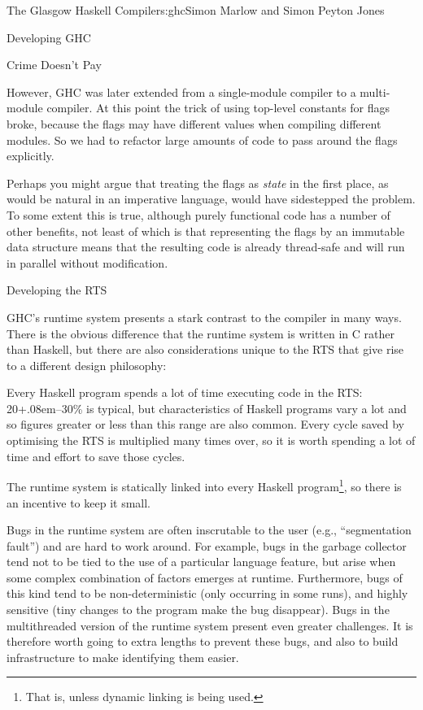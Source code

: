 \begin{aosachapter}{The Glasgow Haskell Compiler}{s:ghc}{Simon Marlow and Simon Peyton Jones}
\begin{aosasect1}{Developing GHC}
\begin{aosasect2}{Crime Doesn't Pay}
\begin{aosaitemize}
  However, GHC was later extended from a single-module compiler to a
  multi-module compiler.  At this point the trick of using top-level
  constants for flags broke, because the flags may have different
  values when compiling different modules.  So we had to refactor
  large amounts of code to pass around the flags explicitly.

  Perhaps you might argue that treating the flags as \emph{state} in
  the first place, as would be natural in an imperative language,
  would have sidestepped the problem.  To some extent this is true,
  although purely functional code has a number of other benefits, not
  least of which is that representing the flags by an immutable data
  structure means that the resulting code is already thread-safe and
  will run in parallel without modification.

\end{aosaitemize}

\end{aosasect2}

\begin{aosasect2}{Developing the RTS}

GHC's runtime system presents a stark contrast to the compiler in many
ways.  There is the obvious difference that the runtime system is
written in C rather than Haskell, but there are also considerations
unique to the RTS that give rise to a different design philosophy:

\begin{aosaenumerate}

\item Every Haskell program spends a lot of time executing code in the
  RTS: 20\kern+.08em--30\% is typical, but characteristics of Haskell programs
  vary a lot and so figures greater or less than this range are also
  common.  Every cycle saved by optimising the RTS is multiplied many
  times over, so it is worth spending a lot of time and effort to save
  those cycles.

\item The runtime system is statically linked into every Haskell
  program\footnote{That is, unless dynamic linking is being used.}, so
  there is an incentive to keep it small.

\item Bugs in the runtime system are often inscrutable to the user
  (e.g., ``segmentation fault'') and are hard to work around.  For
  example, bugs in the garbage collector tend not to be tied to the
  use of a particular language feature, but arise when some complex
  combination of factors emerges at runtime.  Furthermore, bugs of
  this kind tend to be non-deterministic (only occurring in some
  runs), and highly sensitive (tiny changes to the program make the
  bug disappear).  Bugs in the multithreaded version of the runtime
  system present even greater challenges.  It is therefore worth going
  to extra lengths to prevent these bugs, and also to build
  infrastructure to make identifying them easier.


\end{aosaenumerate}
\end{aosasect2}
\end{aosasect1}
\end{aosachapter}
